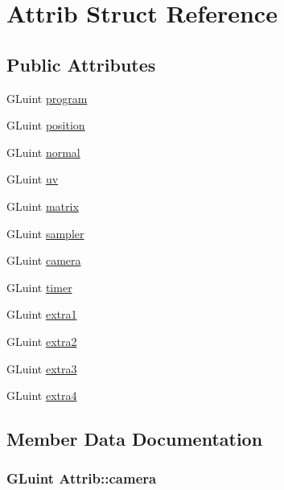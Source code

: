 \hypertarget{structAttrib}{}\section{Attrib Struct Reference}
\label{structAttrib}
\subsection*{Public Attributes}
\begin{DoxyCompactItemize}
\item 
G\+Luint \hyperlink{structAttrib_accbe71d8cd2e04669694902abddf88fd}{program}
\item 
G\+Luint \hyperlink{structAttrib_a2e8900e46275e6dba5de47a6cb3fb014}{position}
\item 
G\+Luint \hyperlink{structAttrib_a1747ed761cce42decf0b1f48e2d424aa}{normal}
\item 
G\+Luint \hyperlink{structAttrib_a91a6c5203f836990dfd2529a4dd128ce}{uv}
\item 
G\+Luint \hyperlink{structAttrib_abf01f51d610dd0ddf14ef44565505dd0}{matrix}
\item 
G\+Luint \hyperlink{structAttrib_ab176427e061e47c040d0a8d25488fd6d}{sampler}
\item 
G\+Luint \hyperlink{structAttrib_a8f4457820b9ba58eeb332bac333c5e55}{camera}
\item 
G\+Luint \hyperlink{structAttrib_aa27da229009adea9e3729e80f7b200b5}{timer}
\item 
G\+Luint \hyperlink{structAttrib_a128a2b0c82df58158709832564ad5ec2}{extra1}
\item 
G\+Luint \hyperlink{structAttrib_a3aeae3bea2c6eda1a2fd8e2387f46dc5}{extra2}
\item 
G\+Luint \hyperlink{structAttrib_a8695ec97ee35d7edda5578eb356ea89c}{extra3}
\item 
G\+Luint \hyperlink{structAttrib_a3cfb70967ab07898959cb0dce7a72ce4}{extra4}
\end{DoxyCompactItemize}


\subsection{Member Data Documentation}
\subsubsection[{\texorpdfstring{camera}{camera}}]{\setlength{\rightskip}{0pt plus 5cm}G\+Luint Attrib\+::camera}\hypertarget{structAttrib_a8f4457820b9ba58eeb332bac333c5e55}{}\label{structAttrib_a8f4457820b9ba58eeb332bac333c5e55}
